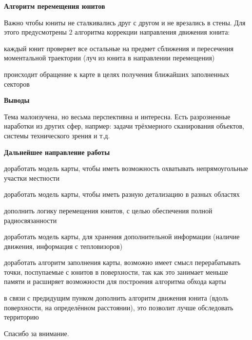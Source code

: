 \begin{slide}

    \makeatletter
    \let\@topfil\relax
    \makeatother

    \textbf{Алгоритм перемещения юнитов}
    
    Важно чтобы юниты не сталкивались друг с другом и не врезались в стены.
    Для этого предусмотрены 2 алгоритма коррекции направления движения юнита: 
    \begin{mintemize}
        \item каждый юнит проверяет все остальные на предмет сближения и пересечения моментальной траектории
              (луч из юнита в направлении перемещения)
        \item происходит обращение к карте в целях получения ближайших заполненных секторов
    \end{mintemize}

\end{slide}

\begin{slide}

    \makeatletter
    \let\@topfil\relax
    \makeatother

    \textbf{Выводы}

    Тема малоизучена, но весьма перспективна и интересна. 
    Есть разрозненные наработки из других сфер, напрмер: 
    задачи трёхмерного сканирования объектов,
    системы технического зрения и т.д.

\end{slide}

\begin{slide}

    \makeatletter
    \let\@topfil\relax
    \makeatother

    \textbf{Дальнейшее направление работы}

    \begin{mintemize}
        \item доработать модель карты, чтобы иметь возможность охватывать непрямоугольные участки местности
        \item доработать модель карты, чтобы иметь разную детализацию в разных областях
        \item дополнить логику перемещения юнитов, с целью обеспечения полной радиосвязанности
        \item доработать модель карты, для хранения дополнительной информации (наличие движения, информация с тепловизоров)
        \item доработать алгоритм заполнения карты, возможно имеет смысл перерабатывать точки, поспупаемые с юнитов в 
                поверхности, так как это занимает меньше памяти и расширяет возможности для построения алгоритма обхода карты
        \item в связи с предидущим пунком дополнить алгоритм движения юнита (вдоль поверхности, на определённом расстоянии),
              это позволит лучше обследовать территорию
    \end{mintemize}

\end{slide}

\begin{cslide}
    \LARGE Спасибо за внимание.
\end{cslide}


